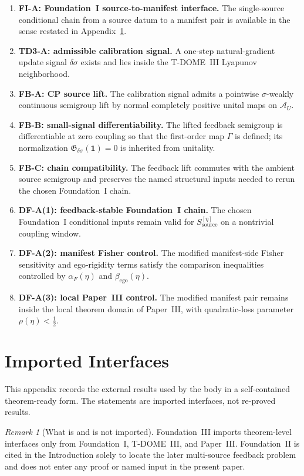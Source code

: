 \documentclass[12pt]{article}
\theoremstyle{definition}
\theoremstyle{remark}
\newtheorem{remark}[theorem]{Remark}
\begin{document}
\begin{enumerate}
\item \textbf{FI-A: Foundation~I source-to-manifest interface.}
  The single-source conditional chain from a source datum to a manifest
  pair is available in the sense restated in
  Appendix~\ref{app:interfaces}.
\item \textbf{TD3-A: admissible calibration signal.}
  A one-step natural-gradient update signal \(\delta\sigma\) exists and
  lies inside the T-DOME~III Lyapunov neighborhood.
\item \textbf{FB-A: CP source lift.}
  The calibration signal admits a pointwise \(\sigma\)-weakly continuous
  semigroup lift by normal completely positive unital maps on
  \(\mathcal A_U\).
\item \textbf{FB-B: small-signal differentiability.}
  The lifted feedback semigroup is differentiable at zero coupling so
  that the first-order map \(\Gamma\) is defined; its normalization
  \(\mathfrak G_{\delta\sigma}(\mathbf 1)=0\) is inherited from
  unitality.
\item \textbf{FB-C: chain compatibility.}
  The feedback lift commutes with the ambient source semigroup and
  preserves the named structural inputs needed to rerun the chosen
  Foundation~I chain.
\item \textbf{DF-A(1): feedback-stable Foundation~I chain.}
  The chosen Foundation~I conditional inputs remain valid for
  \(S_{\mathrm{source}}^{[\eta]}\) on a nontrivial coupling window.
\item \textbf{DF-A(2): manifest Fisher control.}
  The modified manifest-side Fisher sensitivity and ego-rigidity terms
  satisfy the comparison inequalities controlled by
  \(\alpha_F(\eta)\) and \(\beta_{\mathrm{ego}}(\eta)\).
\item \textbf{DF-A(3): local Paper~III control.}
  The modified manifest pair remains inside the local theorem domain of
  Paper~III, with quadratic-loss parameter \(\rho(\eta)<\tfrac12\).
\end{enumerate}

\appendix
\section{Imported Interfaces}\label{app:interfaces}

This appendix records the external results used by the body in a
self-contained theorem-ready form. The statements are imported
interfaces, not re-proved results.

\begin{remark}[What is and is not imported]
Foundation~III imports theorem-level interfaces only from
Foundation~I, T-DOME~III, and Paper~III. Foundation~II is cited in the
Introduction solely to locate the later multi-source feedback problem
and does not enter any proof or named input in the present paper.
\end{remark}
\end{document}
